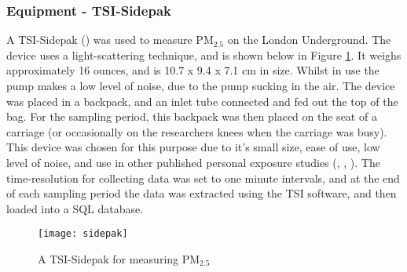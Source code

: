 \subsubsection{Equipment - TSI-Sidepak}
\label{sec:equipment_tsi_sidepak}

A TSI-Sidepak (\cite{TSI2015}) was used to measure PM$_{2.5}$ on the London Underground. The device uses a light-scattering technique, and is shown below in Figure \ref{fig:sidepak}. It weighs approximately 16 ounces, and is 10.7 x 9.4 x 7.1 cm in size. Whilst in use the pump makes a low level of noise, due to the pump sucking in the air. The device was placed in a backpack, and an inlet tube connected and fed out the top of the bag. For the sampling period, this backpack was then placed on the seat of a carriage (or occasionally on the researchers knees when the carriage was busy). This device was chosen for this purpose due to it's small size, ease of use, low level of noise, and use in other published personal exposure studies (\cite{Huang2015}, \cite{Han2015}, \cite{Yu2016}). The time-resolution for collecting data was set to one minute intervals, and at the end of each sampling period the data was extracted using the TSI software, and then loaded into a SQL database.

\begin{figure}[H]
\centering
\texttt{[image: sidepak]}
\caption{A TSI-Sidepak for measuring PM$_{2.5}$}
\label{fig:sidepak}
\end{figure}

